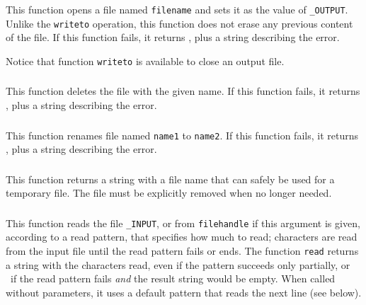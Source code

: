 \subsubsection*{\ff {}}

This function opens a file named \verb|filename| and sets it as the
value of \verb|_OUTPUT|.
Unlike the \verb|writeto| operation,
this function does not erase any previous content of the file.
If this function fails, it returns \nil,
plus a string describing the error.

Notice that function \verb|writeto| is available to close an output file.

\subsubsection*{\ff {}}

This function deletes the file with the given name.
If this function fails, it returns \nil,
plus a string describing the error.

\subsubsection*{\ff {}}

This function renames file named \verb|name1| to \verb|name2|.
If this function fails, it returns \nil,
plus a string describing the error.

\subsubsection*{\ff {}}

This function returns a string with a file name that can safely
be used for a temporary file.
The file must be explicitly removed when no longer needed.

\subsubsection*{\ff {}}

This function reads the file \verb|_INPUT|,
or from \verb|filehandle| if this argument is given,
according to a read pattern, that specifies how much to read;
characters are read from the input file until
the read pattern fails or ends.
The function \verb|read| returns a string with the characters read,
even if the pattern succeeds only partially,
or \nil\ if the read pattern fails \emph{and}
the result string would be empty.
When called without parameters,
it uses a default pattern that reads the next line
(see below).

